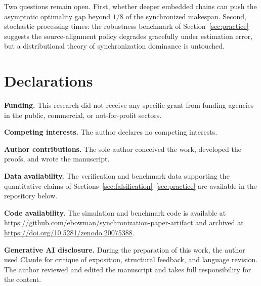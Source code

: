 \documentclass[sn-mathphys,NameDate]{sn-jnl}
\theoremstyle{thmstyleone}
\theoremstyle{thmstylethree}
\theoremstyle{thmstyletwo}
\begin{document}
Two questions remain open. First, whether deeper embedded
chains can push the asymptotic optimality gap beyond $1/8$ of
the synchronized makespan. Second, stochastic processing
times: the robustness benchmark of
Section~\ref{sec:practice} suggests the source-alignment
policy degrades gracefully under estimation error, but a
distributional theory of synchronization dominance is
untouched.


\section*{Declarations}

\textbf{Funding.}
This research did not receive any specific grant from funding
agencies in the public, commercial, or not-for-profit sectors.

\textbf{Competing interests.}
The author declares no competing interests.

\textbf{Author contributions.}
The sole author conceived the work, developed the proofs, and
wrote the manuscript.

\textbf{Data availability.}
The verification and benchmark data supporting the
quantitative claims of
Sections~\ref{sec:falsification}--\ref{sec:practice} are
available in the repository below.

\textbf{Code availability.}
The simulation and benchmark code is available at
\url{https://github.com/ebowman/synchronization-paper-artifact}
and archived at
\url{https://doi.org/10.5281/zenodo.20075388}.

\textbf{Generative AI disclosure.}
During the preparation of this work, the author used Claude
for critique of exposition, structural feedback, and language
revision. The author reviewed and edited the manuscript and
takes full responsibility for the content.



\end{document}

